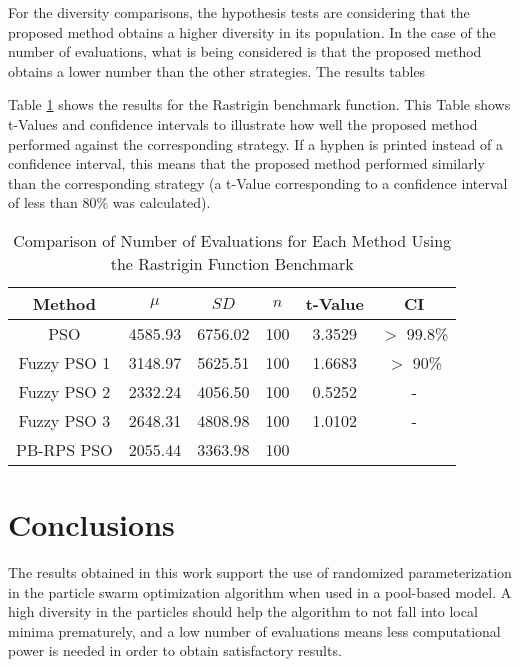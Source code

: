 For the diversity comparisons, the hypothesis tests are considering that the proposed method obtains a higher diversity in its population. In the case of the number of evaluations, what is being considered is that the proposed method obtains a lower number than the other strategies. The results tables %

Table \ref{evaluations-rastrigin} shows the results for the Rastrigin benchmark function. This Table shows t-Values and confidence intervals to illustrate how well the proposed method performed against the corresponding strategy. If a hyphen is printed instead of a confidence interval, this means that the proposed method performed similarly than the corresponding strategy (a t-Value corresponding to a confidence interval of less than 80\% was calculated).

\begin{table}[!t]
  \renewcommand{\arraystretch}{1.3}
  \caption{Comparison of Number of Evaluations for Each Method Using the Rastrigin Function Benchmark}
  \label{evaluations-rastrigin}
  \centering
  \begin{tabular}{|c|c|c|c|c|c|}
    \hline
    Method & $\mu$ & $SD$ & $n$ & t-Value & CI \\
    \hline
    PSO 		& 4585.93 & 6756.02 & 100 & 3.3529 & $>$ 99.8\% \\
    \hline
    Fuzzy PSO 1 & 3148.97 & 5625.51 & 100 & 1.6683 & $>$ 90\% \\
    \hline
    Fuzzy PSO 2 & 2332.24 & 4056.50 & 100 & 0.5252 & - \\
    \hline
    Fuzzy PSO 3 & 2648.31 & 4808.98 & 100 & 1.0102 & - \\
    \hline
    PB-RPS PSO  & 2055.44 & 3363.98 & 100 &  &  \\
    \hline
  \end{tabular}
\end{table}


\section{Conclusions}
\label{conclusions}

The results obtained in this work support the use of randomized parameterization in the particle swarm optimization algorithm when used in a pool-based model. %
%
A high diversity in the particles should help the algorithm to not fall into local minima prematurely, and a low number of evaluations means less computational power is needed in order to obtain satisfactory results. %
